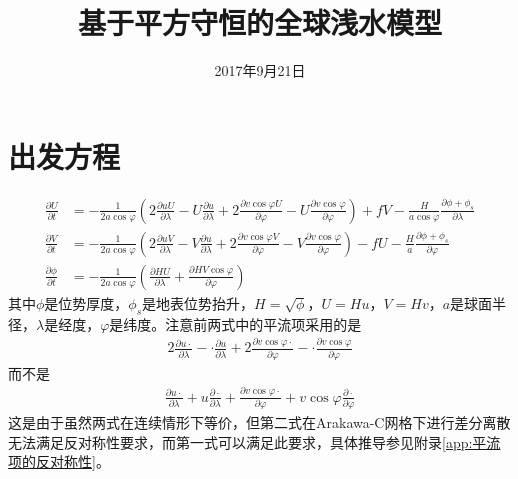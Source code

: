 \documentclass{ctexart}
\title{基于平方守恒的全球浅水模型}
\date{2017年9月21日}
\begin{document}
\maketitle

\section{出发方程}

\begin{align}
	\frac{\partial U}{\partial t} & = - \frac{1}{2 a \cos{\varphi}} \left( 2 \frac{\partial u U}{\partial \lambda} - U \frac{\partial u}{\partial \lambda} + 2 \frac{\partial v \cos{\varphi} U}{\partial \varphi} - U \frac{\partial v \cos{\varphi}}{\partial \varphi} \right) + f V - \frac{H}{a \cos{\varphi}} \frac{\partial \phi + \phi_s}{\partial \lambda} \\
  \frac{\partial V}{\partial t} & = - \frac{1}{2 a \cos{\varphi}} \left( 2 \frac{\partial u V}{\partial \lambda} - V \frac{\partial u}{\partial \lambda} + 2 \frac{\partial v \cos{\varphi} V}{\partial \varphi} - V \frac{\partial v \cos{\varphi}}{\partial \varphi} \right) - f U - \frac{H}{a} \frac{\partial \phi + \phi_s}{\partial \varphi} \\
  \frac{\partial \phi}{\partial t} & = - \frac{1}{2 a \cos{\varphi}} \left( \frac{\partial H U}{\partial \lambda} + \frac{\partial H V \cos{\varphi}}{\partial \varphi} \right)
\end{align}
其中$\phi$是位势厚度，$\phi_s$是地表位势抬升，$H = \sqrt{\phi}$，$U = H u$，$V = H v$，$a$是球面半径，$\lambda$是经度，$\varphi$是纬度。注意前两式中的平流项采用的是
\begin{align}
  2 \frac{\partial u \cdot}{\partial \lambda} - \cdot \frac{\partial u}{\partial \lambda} + 2 \frac{\partial v \cos{\varphi} \cdot}{\partial \varphi} - \cdot \frac{\partial v \cos{\varphi}}{\partial \varphi}
\end{align}
而不是
\begin{align}
  \frac{\partial u \cdot}{\partial \lambda} + u \frac{\partial \cdot}{\partial \lambda} + \frac{\partial v \cos{\varphi} \cdot}{\partial \varphi} + v \cos{\varphi} \frac{\partial \cdot}{\partial \varphi}
\end{align}
这是由于虽然两式在连续情形下等价，但第二式在Arakawa-C网格下进行差分离散无法满足反对称性要求，而第一式可以满足此要求，具体推导参见附录\ref{app:平流项的反对称性}。
\end{document}
